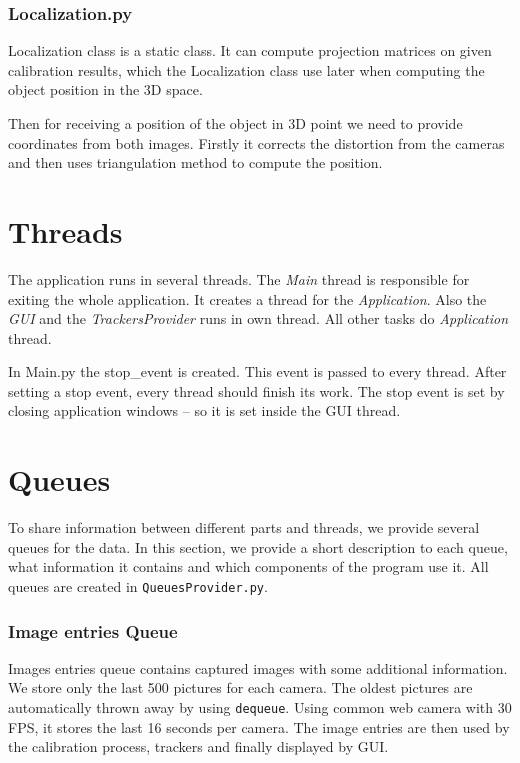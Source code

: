 \subsubsection*{Localization.py}

Localization class is a static class. It can compute projection matrices on
given calibration results, which the Localization class use later when
computing the object position in the 3D space.

Then for receiving a position of the object in 3D point we need to provide
coordinates from both images. Firstly it corrects the distortion from the
cameras and then uses triangulation method to compute the position.

\section{Threads}

The application runs in several threads. The \emph{Main} thread is responsible
for exiting the whole application. It creates a thread for the
\emph{Application}. Also the \emph{GUI} and the \emph{TrackersProvider}
runs in own thread. All other tasks do \emph{Application} thread.

In Main.py the stop\_event is created. This event is passed to every
thread. After setting a stop event, every thread should finish its work. The
stop event is set by closing application windows -- so it is set inside the GUI
thread.

\section{Queues}

To share information between different parts and threads, we provide several
queues for the data. In this section, we provide a short description to each
queue, what information it contains and which components of the program use it.
All queues are created in \verb+QueuesProvider.py+. 

\subsubsection{Image entries Queue}

Images entries queue contains captured images with some additional
information. We store only the last 500 pictures for each camera. The oldest
pictures are automatically thrown away by using \verb+dequeue+. Using common
web camera with 30 FPS, it stores the last 16 seconds per camera. The image
entries are then used by the calibration process, trackers and finally
displayed by GUI.

